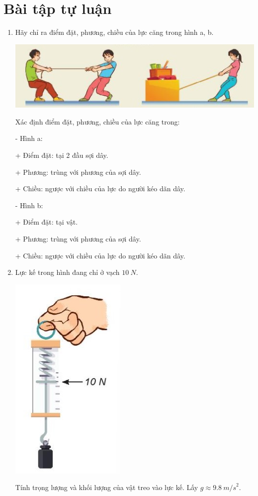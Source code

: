 \section{Bài tập tự luận}
\begin{enumerate}[label=\bfseries Bài \arabic*:]
	\item {}
	
	
	{Hãy chỉ ra điểm đặt, phương, chiều của lực căng trong hình a, b.
		\begin{center}
			\includegraphics[scale=1]{../figs/VN10-2022-PH-TP019-3.jpg}
		\end{center}
	}
	
	\hideall
	{
		Xác định điểm đặt, phương, chiều của lực căng trong:
		
		- Hình a:
		
		+ Điểm đặt: tại 2 đầu sợi dây.
		
		+ Phương: trùng với phương của sợi dây.
		
		+ Chiều: ngược với chiều của lực do người kéo dãn dây.
		
		- Hình b:
		
		+ Điểm đặt: tại vật.
		
		+ Phương: trùng với phương của sợi dây.
		
		+ Chiều: ngược với chiều của lực do người kéo dãn dây.
		
	}
	\item {}
	
	{
		Lực kế trong hình đang chỉ ở vạch $\SI{10}{N}$.
		\begin{center}
			\includegraphics[scale=0.8]{../figs/VN10-2022-PH-TP019-1.jpg}
		\end{center}
		Tính trọng lượng và khối lượng của vật treo vào lực kế. Lấy $g \approx \SI{9,8}{m/s}^2$.
		
}
\end{enumerate}
